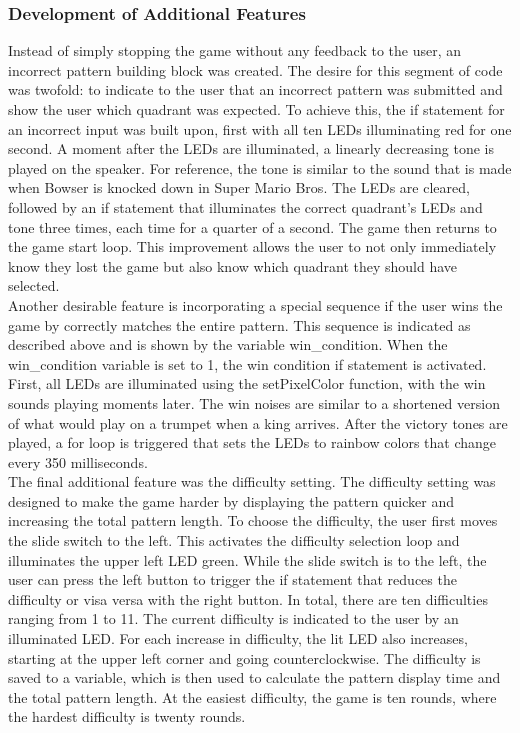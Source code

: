 \documentclass[12pt]{article}
\begin{document}
\subsubsection{Development of Additional Features}
Instead of simply stopping the game without any feedback to the user, an incorrect pattern building block was created. The desire for this segment of code was twofold: to indicate to the user that an incorrect pattern was submitted and show the user which quadrant was expected. To achieve this, the if statement for an incorrect input was built upon, first with all ten LEDs illuminating red for one second. A moment after the LEDs are illuminated, a linearly decreasing tone is played on the speaker. For reference, the tone is similar to the sound that is made when Bowser is knocked down in Super Mario Bros. The LEDs are cleared, followed by an if statement that illuminates the correct quadrant's LEDs and tone three times, each time for a quarter of a second. The game then returns to the game start loop. This improvement allows the user to not only immediately know they lost the game but also know which quadrant they should have selected.
\vspace*{0.5cm}
\\
Another desirable feature is incorporating a special sequence if the user wins the game by correctly matches the entire pattern. This sequence is indicated as described above and is shown by the variable win\_condition. When the win\_condition variable is set to 1, the win condition if statement is activated. First, all LEDs are illuminated using the setPixelColor function, with the win sounds playing moments later. The win noises are similar to a shortened version of what would play on a trumpet when a king arrives. After the victory tones are played, a for loop is triggered that sets the LEDs to rainbow colors that change every 350 milliseconds.
\vspace*{0.5cm}
\\
The final additional feature was the difficulty setting. The difficulty setting was designed to make the game harder by displaying the pattern quicker and increasing the total pattern length. To choose the difficulty, the user first moves the slide switch to the left. This activates the difficulty selection loop and illuminates the upper left LED green. While the slide switch is to the left, the user can press the left button to trigger the if statement that reduces the difficulty or visa versa with the right button. In total, there are ten difficulties ranging from 1 to 11. The current difficulty is indicated to the user by an illuminated LED. For each increase in difficulty, the lit LED also increases, starting at the upper left corner and going counterclockwise. The difficulty is saved to a variable, which is then used to calculate the pattern display time and the total pattern length. At the easiest difficulty, the game is ten rounds, where the hardest difficulty is twenty rounds.
\end{document}
